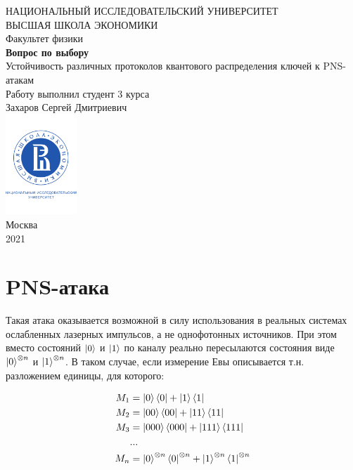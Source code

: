 \documentclass[a4paper, 12pt]{article}
\begin{document}
	\begin{titlepage}
		\begin{center}
			$$$$
			$$$$
			$$$$
			$$$$
			{\Large{НАЦИОНАЛЬНЫЙ ИССЛЕДОВАТЕЛЬСКИЙ УНИВЕРСИТЕТ}}\\
			\vspace{0.1cm}
			{\Large{ВЫСШАЯ ШКОЛА ЭКОНОМИКИ}}\\
			\vspace{0.25cm}
			{\large{Факультет физики}}\\
			\vspace{5.5cm}
			{\Huge\textbf{{Вопрос по выбору}}}\\%
			\vspace{1cm}
			{\LARGE{Устойчивость различных протоколов квантового распределения ключей к PNS-атакам}}\\%
			\vspace{2cm}
			{Работу выполнил студент 3 курса}\\
			{Захаров Сергей Дмитриевич}\\
			\vfill
			\includegraphics[width = 0.2\textwidth]{HSElogo}\\
			\vfill
			Москва\\
			2021
		\end{center}
	\end{titlepage}
	
\tableofcontents


\newpage

\section{PNS-атака}

Такая атака оказывается возможной в силу использования в реальных системах ослабленных лазерных импульсов, а не однофотонных источников. При этом вместо состояний $\ket{0}$ и $\ket{1}$ по каналу реально пересылаются состояния виде $\ket{0}^{\otimes n}$ и $\ket{1}^{\otimes n}$. В таком случае, если измерение Евы описывается т.н. разложением единицы, для которого:

\begin{align}
	M_1 &= \ket{0}\bra{0} + \ket{1}\bra{1} \\
	M_2 &= \ket{00}\bra{00} + \ket{11}\bra{11}\\
	M_3 &= \ket{000}\bra{000} + \ket{111}\bra{111}\\
	&...\\
	M_n &= \ket{0}^{\otimes n}\bra{0}^{\otimes n} + \ket{1}^{\otimes n}\bra{1}^{\otimes n}
\end{align}
\end{document}
